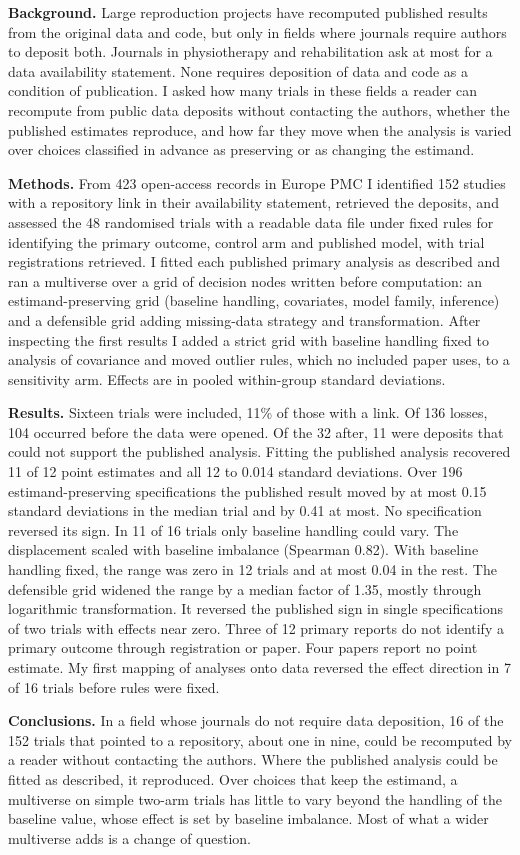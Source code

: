 \textbf{Background.} Large reproduction projects have recomputed published results from the original data and code, but only in fields where journals require authors to deposit both. Journals in physiotherapy and rehabilitation ask at most for a data availability statement. None requires deposition of data and code as a condition of publication. I asked how many trials in these fields a reader can recompute from public data deposits without contacting the authors, whether the published estimates reproduce, and how far they move when the analysis is varied over choices classified in advance as preserving or as changing the estimand.

\textbf{Methods.} From 423 open-access records in Europe PMC I identified 152 studies with a repository link in their availability statement, retrieved the deposits, and assessed the 48 randomised trials with a readable data file under fixed rules for identifying the primary outcome, control arm and published model, with trial registrations retrieved. I fitted each published primary analysis as described and ran a multiverse over a grid of decision nodes written before computation: an estimand-preserving grid (baseline handling, covariates, model family, inference) and a defensible grid adding missing-data strategy and transformation. After inspecting the first results I added a strict grid with baseline handling fixed to analysis of covariance and moved outlier rules, which no included paper uses, to a sensitivity arm. Effects are in pooled within-group standard deviations.

\textbf{Results.} Sixteen trials were included, 11\% of those with a link. Of 136 losses, 104 occurred before the data were opened. Of the 32 after, 11 were deposits that could not support the published analysis. Fitting the published analysis recovered 11 of 12 point estimates and all 12 to 0.014 standard deviations. Over 196 estimand-preserving specifications the published result moved by at most 0.15 standard deviations in the median trial and by 0.41 at most. No specification reversed its sign. In 11 of 16 trials only baseline handling could vary. The displacement scaled with baseline imbalance (Spearman 0.82). With baseline handling fixed, the range was zero in 12 trials and at most 0.04 in the rest. The defensible grid widened the range by a median factor of 1.35, mostly through logarithmic transformation. It reversed the published sign in single specifications of two trials with effects near zero. Three of 12 primary reports do not identify a primary outcome through registration or paper. Four papers report no point estimate. My first mapping of analyses onto data reversed the effect direction in 7 of 16 trials before rules were fixed.

\textbf{Conclusions.} In a field whose journals do not require data deposition, 16 of the 152 trials that pointed to a repository, about one in nine, could be recomputed by a reader without contacting the authors. Where the published analysis could be fitted as described, it reproduced. Over choices that keep the estimand, a multiverse on simple two-arm trials has little to vary beyond the handling of the baseline value, whose effect is set by baseline imbalance. Most of what a wider multiverse adds is a change of question.
